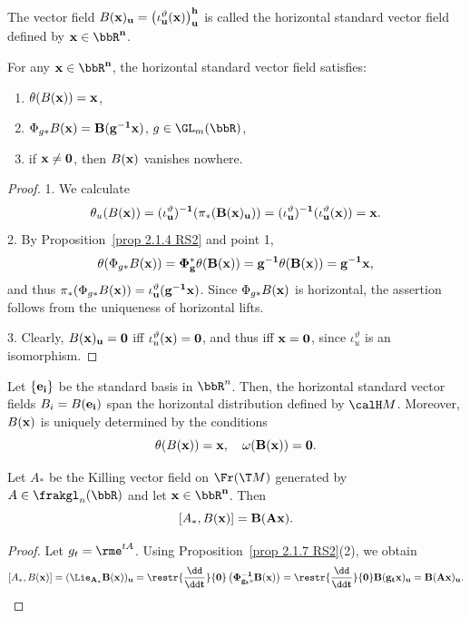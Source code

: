 \begin{defn}
    The vector field $B(\bf{x})_u=\left(\iota_u^\vartheta(\bf{x})\right)_u^h$ is called the horizontal standard vector field defined by $\bf{x}\in\bbR^n$.
\end{defn}

\begin{prop}[{{\cite[Prop.~2.1.7]{RS2}}}]\label{prop 2.1.7 RS2}
    For any $\bf{x}\in\bbR^n$, the horizontal standard vector field satisfies:
    \begin{enumerate}
        \item $\theta(B(\bf{x}))=\bf{x}$,
        \item $\Phi_{g\ast}B(\bf{x})=B(g^{-1}\bf{x})$, $g\in\GL_m(\bbR)$,
        \item if $\bf{x}\neq 0$, then $B(\bf{x})$ vanishes nowhere.
    \end{enumerate}
\end{prop}
\begin{proof}
    1. We calculate
    \[\theta_u(B(\bf{x}))=(\iota_u^\vartheta)^{-1}(\pi_\ast(B(\bf{x})_u))=(\iota_u^\vartheta)^{-1}(\iota_u^\vartheta(\bf{x}))=\bf{x}.\]
    2. By Proposition~\ref{prop 2.1.4 RS2} and point 1, 
    \[\theta(\Phi_{g\ast}B(\bf{x}))=\Phi_g^\ast \theta(B(\bf{x}))=g^{-1}\theta(B(\bf{x}))=g^{-1}\bf{x},\]
    and thus $\pi_\ast(\Phi_{g\ast}B(\bf{x}))=\iota_u^\vartheta(g^{-1}\bf{x})$. Since $\Phi_{g\ast}B(\bf{x})$ is horizontal, the assertion follows from the uniqueness of horizontal lifts.

    3. Clearly, $B(\bf{x})_u=0$ iff $\iota_u^\vartheta(\bf{x})=0$, and thus iff $\bf{x}=0$, since $\iota_u^\vartheta$ is an isomorphism.
\end{proof}

\begin{rem}\label{rem 2.1.8 RS2}
    Let $\{\bf{e}_i\}$ be the standard basis in $\bbR^n$. Then, the horizontal standard vector fields $B_i=B(\bf{e}_i)$ span the horizontal distribution defined by $\calH M$. Moreover, $B(\bf{x})$ is uniquely determined by the conditions
    \[\theta(B(\bf{x}))=\bf{x},\quad \omega(B(\bf{x}))=0.\]
\end{rem}


\begin{lem}[{{\cite[Lem.~2.1.9]{RS2}}}]\label{lem 2.1.9 RS2}
    Let $A_\ast$ be the Killing vector field on $\Fr(\T M)$ generated by $A\in\frakgl_n(\bbR)$ and let $\bf{x}\in\bbR^n$. Then
    \[[A_\ast,B(\bf{x})]=B(A\bf{x}).\]
\end{lem}
\begin{proof}
    Let $g_t=\rme^{tA}$. Using Proposition~\ref{prop 2.1.7 RS2}(2), we obtain
    \[[A_\ast,B(\bf{x})]=(\Lie_{A_\ast}B(\bf{x}))_u=\restr{\frac{\dd}{\dd t}}{0}\left(\Phi_{g_t\ast}^{-1}B(\bf{x})\right)= \restr{\frac{\dd}{\dd t}}{0} B(g_t\bf{x})_u=B(A\bf{x})_u.\]
\end{proof}

